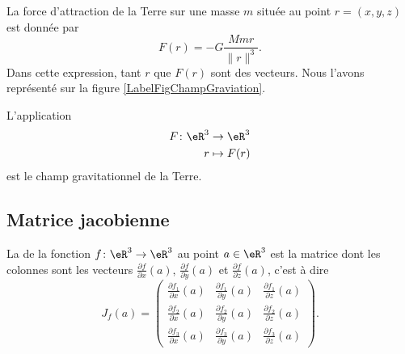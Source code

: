\begin{example}
    La force d'attraction de la Terre sur une masse $m$ située au point $r=(x,y,z)$ est donnée par
    \begin{equation}
        F(r)=-G\frac{ Mmr }{ \| r \|^3 }.
    \end{equation}
    Dans cette expression, tant $r$ que $F(r)$ sont des vecteurs. Nous l'avons représenté sur la figure \ref{LabelFigChampGraviation}.
    \newcommand{\CaptionFigChampGraviation}{Le champ de gravitation de la Terre.}
    

    L'application
    \begin{equation}
        \begin{aligned}
            F\colon \eR^3&\to \eR^3 \\
            r&\mapsto F(r) 
        \end{aligned}
    \end{equation}
    est le champ gravitationnel de la Terre.

\end{example}

\subsection{Matrice jacobienne}

La  de la fonction $f\colon \eR^3\to \eR^3$ au point $a\in\eR^3$ est la matrice dont les colonnes sont les vecteurs $\frac{ \partial f }{ \partial x }(a)$, $\frac{ \partial f }{ \partial y }(a)$ et $\frac{ \partial f }{ \partial z }(a)$, c'est à dire
\begin{equation}
    J_f(a)=\begin{pmatrix}
        \frac{ \partial f_1 }{ \partial x }(a)   &   \frac{ \partial f_1 }{ \partial y }(a)    &   \frac{ \partial f_1 }{ \partial z }(a)    \\
        \frac{ \partial f_2 }{ \partial x }(a)   &   \frac{ \partial f_2 }{ \partial y }(a)    &   \frac{ \partial f_2 }{ \partial z }(a)    \\
        \frac{ \partial f_3 }{ \partial x }(a)   &   \frac{ \partial f_3 }{ \partial y }(a)    &   \frac{ \partial f_3 }{ \partial z }(a)    
    \end{pmatrix}.
\end{equation}

